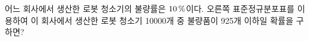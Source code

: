 \noindent\begin{minipage}[t]{0.58\linewidth}\vspace{0pt}\raggedright 어느 회사에서 생산한 로봇 청소기의 불량률은 $10\mkern3mu \%$이다. 오른쪽 표준정규분포표를 이용하여 이 회사에서 생산한 로봇 청소기 10000개 중 불량품이 925개 이하일 확률을 구하면?\end{minipage}\hfill\begin{minipage}[t]{0.4\linewidth}\vspace{0pt}\centering \resizebox{\ifdim\width>\linewidth\linewidth\else\width\fi}{!}{}\end{minipage}\par
{}

